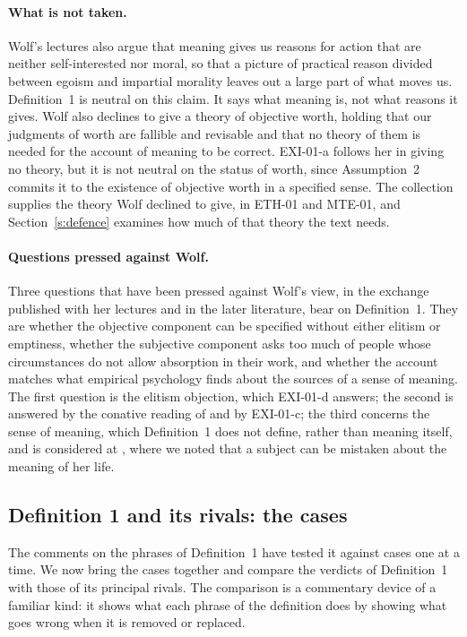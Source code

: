 \paragraph{What is not taken.} Wolf's lectures also argue that meaning gives us reasons for action that are neither self-interested nor moral, so that a picture of practical reason divided between egoism and impartial morality leaves out a large part of what moves us. Definition~1 is neutral on this claim. It says what meaning is, not what reasons it gives. Wolf also declines to give a theory of objective worth, holding that our judgments of worth are fallible and revisable and that no theory of them is needed for the account of meaning to be correct. EXI-01-a follows her in giving no theory, but it is not neutral on the status of worth, since Assumption~2 commits it to the existence of objective worth in a specified sense. The collection supplies the theory Wolf declined to give, in ETH-01 and MTE-01, and Section~\ref{s:defence} examines how much of that theory the text needs.

\paragraph{Questions pressed against Wolf.} Three questions that have been pressed against Wolf's view, in the exchange published with her lectures and in the later literature, bear on Definition~1. They are whether the objective component can be specified without either elitism or emptiness, whether the subjective component asks too much of people whose circumstances do not allow absorption in their work, and whether the account matches what empirical psychology finds about the sources of a sense of meaning. The first question is the elitism objection, which EXI-01-d answers; the second is answered by the conative reading of  and by EXI-01-c; the third concerns the sense of meaning, which Definition~1 does not define, rather than meaning itself, and is considered at , where we noted that a subject can be mistaken about the meaning of her life.

\subsection{Definition 1 and its rivals: the cases}\label{s:rivals}

The comments on the phrases of Definition~1 have tested it against cases one at a time. We now bring the cases together and compare the verdicts of Definition~1 with those of its principal rivals. The comparison is a commentary device of a familiar kind: it shows what each phrase of the definition does by showing what goes wrong when it is removed or replaced.

